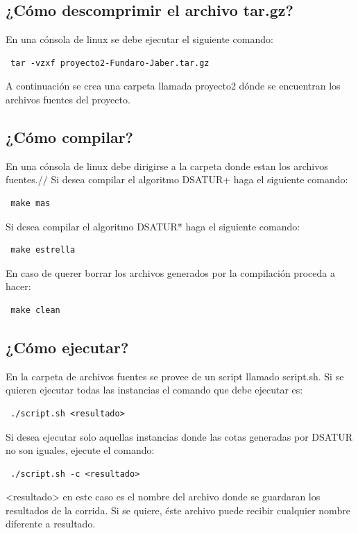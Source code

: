 \documentclass[a4paper,10pt]{article}
\begin{document}
\subsection{¿Cómo descomprimir el archivo tar.gz?}
En una cónsola de linux se debe ejecutar el siguiente comando:
\begin{verbatim}
 tar -vzxf proyecto2-Fundaro-Jaber.tar.gz
\end{verbatim}
A continuación se crea una carpeta llamada proyecto2 dónde se encuentran
los archivos fuentes del proyecto.


\subsection{¿Cómo compilar?}
En una cónsola de linux debe dirigirse a la carpeta donde estan los
archivos fuentes.//
\indent Si desea compilar el algoritmo DSATUR+ haga el siguiente comando:
\begin{verbatim}
 make mas
\end{verbatim}

\indent Si desea compilar el algoritmo DSATUR* haga el siguiente comando:
\begin{verbatim}
 make estrella
\end{verbatim}

En caso de querer borrar los archivos generados por la compilación
proceda a hacer:
\begin{verbatim}
 make clean
\end{verbatim}

\subsection{¿Cómo ejecutar?}
En la carpeta de archivos fuentes se provee de un script llamado
script.sh. Si se quieren ejecutar todas las instancias el comando que
debe ejecutar es:
\begin{verbatim}
 ./script.sh <resultado>
\end{verbatim}

Si desea ejecutar solo aquellas instancias donde las cotas generadas por
DSATUR no son iguales, ejecute el comando:
\begin{verbatim}
 ./script.sh -c <resultado>
\end{verbatim}

<resultado> en este caso es el nombre del archivo donde se guardaran los
resultados de la corrida. Si se quiere, éste archivo puede recibir
cualquier nombre diferente a resultado.
\end{document}
